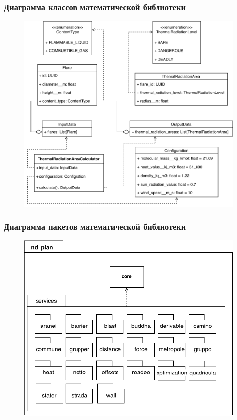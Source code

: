 \begin{frame}
\frametitle{Диаграмма классов математической библиотеки}
\begin{figure}
    \includegraphics[scale=.45]{pictures/implementation/math_classes}
\end{figure}
\end{frame}

\begin{frame}
\frametitle{Диаграмма пакетов математической библиотеки}
\begin{figure}
    \includegraphics[scale=.49]{pictures/implementation/math_packages}
\end{figure}
\end{frame}

